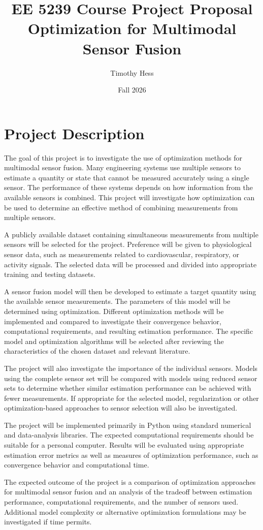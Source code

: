\documentclass[11pt]{article}
\title{\textbf{EE 5239 Course Project Proposal}\\
Optimization for Multimodal Sensor Fusion}
\author{Timothy Hess}
\date{Fall 2026}
\begin{document}
\maketitle

\section*{Project Description}

The goal of this project is to investigate the use of optimization methods for
multimodal sensor fusion. Many engineering systems use multiple sensors to estimate
a quantity or state that cannot be measured accurately using a single sensor. The
performance of these systems depends on how information from the available sensors
is combined. This project will investigate how optimization can be used to determine
an effective method of combining measurements from multiple sensors.

A publicly available dataset containing simultaneous measurements from multiple
sensors will be selected for the project. Preference will be given to physiological
sensor data, such as measurements related to cardiovascular, respiratory, or activity
signals. The selected data will be processed and divided into appropriate training
and testing datasets.

A sensor fusion model will then be developed to estimate a target quantity using the
available sensor measurements. The parameters of this model will be determined using
optimization. Different optimization methods will be implemented and compared to
investigate their convergence behavior, computational requirements, and resulting
estimation performance. The specific model and optimization algorithms will be
selected after reviewing the characteristics of the chosen dataset and relevant
literature.

The project will also investigate the importance of the individual sensors. Models
using the complete sensor set will be compared with models using reduced sensor sets
to determine whether similar estimation performance can be achieved with fewer
measurements. If appropriate for the selected model, regularization or other
optimization-based approaches to sensor selection will also be investigated.

The project will be implemented primarily in Python using standard numerical and
data-analysis libraries. The expected computational requirements should be suitable
for a personal computer. Results will be evaluated using appropriate estimation
error metrics as well as measures of optimization performance, such as convergence
behavior and computational time.

The expected outcome of the project is a comparison of optimization approaches for
multimodal sensor fusion and an analysis of the tradeoff between estimation
performance, computational requirements, and the number of sensors used. Additional
model complexity or alternative optimization formulations may be investigated if
time permits.
\end{document}
